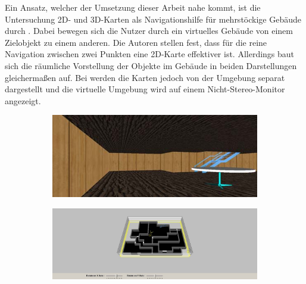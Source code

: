 Ein Ansatz, welcher der Umsetzung dieser Arbeit nahe kommt, ist die Untersuchung 2D- und 3D-Karten als Navigationshilfe für mehrstöckige Gebäude durch \autocite[siehe \autoref{fig:chittaro2006_maps}]{Chittaro2006}.
Dabei bewegen sich die Nutzer durch ein virtuelles Gebäude von einem Zielobjekt zu einem anderen.
Die Autoren stellen fest, dass für die reine Navigation zwischen zwei Punkten eine 2D-Karte effektiver ist.
Allerdings baut sich die räumliche Vorstellung der Objekte im Gebäude in beiden Darstellungen gleichermaßen auf.
Bei \parencite{Chittaro2006} werden die Karten jedoch von der Umgebung separat dargestellt und die virtuelle Umgebung wird auf einem Nicht-Stereo-Monitor angezeigt.
\begin{figure}[ptb]
	\centering
	\begin{subfigure}{0.6\textwidth}
		\includegraphics[width=\textwidth]{figures/chittaro2006_ve.png}
		\caption{}
		\label{sfig:chittaro2006_ve}
	\end{subfigure}

	\begin{subfigure}{0.6\textwidth}
		\includegraphics[width=\textwidth]{figures/chittaro2006_3dm.png}
		\caption{}
		\label{sfig:chittaro2006_3dm}
	\end{subfigure}


\end{figure}
